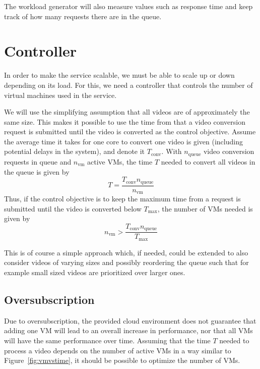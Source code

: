 \documentclass[a4paper, 10pt, english]{article}
\begin{document}
The workload generator will also measure values such as response time and keep track of how many requests there are in the queue.
\section{Controller}
In order to make the service scalable, we must be able to scale up or down depending on its load. For this, we need a controller that controls the number of virtual machines used in the service.

We will use the simplifying assumption that all videos are of approximately the same size. This makes it possible to use the time from that a video conversion request is submitted until the video is converted as the control objective. Assume the average time it takes for one core to convert one video is given (including potential delays in the system), and denote it $ T_{\text{conv}} $. With $ n_{\text{queue}} $ video conversion requests in queue and $ n_{\text{vm}} $ active VMs, the time $ T $ needed to convert all videos in the queue is given by
\begin{equation}
T = \frac{T_{\text{conv}}  n_{\text{queue}}}{n_{\text{vm}}}
\end{equation}
Thus, if the control objective is to keep the maximum time from a request is submitted until the video is converted below $ T_{\text{max}} $, the number of VMs needed is given by
\begin{equation}
n_{\text{vm}} > \frac{T_{\text{conv}}  n_{\text{queue}}}{T_{\text{max}}}
\end{equation}

This is of course a simple approach which, if needed, could be extended to also consider videos of varying sizes and possibly reordering the queue such that for example small sized videos are prioritized over larger ones.

\subsection{Oversubscription}
Due to oversubscription, the provided cloud environment does not guarantee that adding one VM will lead to an overall increase in performance, nor that all VMs will have the same performance over time. Assuming that the time $ T $ needed to process a video depends on the number of active VMs in a way similar to Figure~\ref{fig:vmvstime}, it should be possible to optimize the number of VMs.
\end{document}
